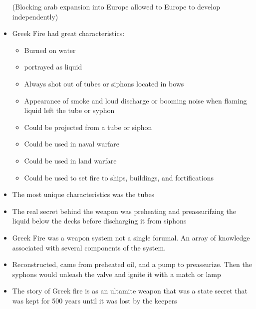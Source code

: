 \documentclass{article}
\begin{document}
\begin{itemize}
    (Blocking arab expansion into Europe allowed to Europe to develop independently)
  \item Greek Fire had great characteristics:
    \begin{itemize}
      \item Burned on water
      \item portrayed as liquid
      \item Always shot out of tubes or siphons
        located in bows
      \item Appearance of smoke and loud discharge or booming noise when flaming liquid
        left the tube or syphon
      \item Could be projected from a tube or siphon
      \item Could be used in naval warfare
      \item Could be used in land warfare
      \item Could be used to set fire to ships, buildings, and fortifications
    \end{itemize}
  \item The most unique characteristics was the tubes
  \item The real secret behind the weapon was preheating and preassurifzing the liquid below the
    decks before discharging it from siphons
  \item Greek Fire was a weapon system not a single forumal. An array of knowledge
    associated with several components of the system.
  \item Reconstructed, came from preheated oil, and a pump to preassurize. Then
    the syphons would unleash the valve and ignite it with a match or lamp
  \item The story of Greek fire is as an ultamite weapon that was a state secret
    that was kept for 500 years until it was lost by the keepers
\end{itemize}
\end{document}
